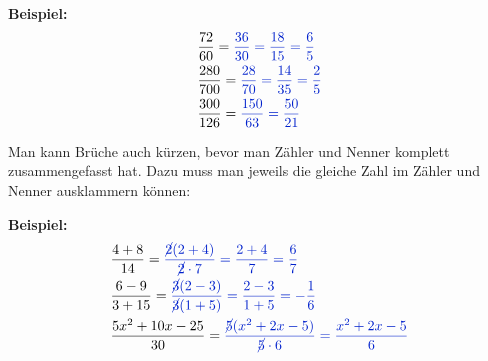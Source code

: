 \textbf{Beispiel:}
\begin{align*}
	&\frac{72}{60}=\textcolor{loes}{\frac{36}{30}=\frac{18}{15}=\frac{6}{5}}\\
	&\frac{280}{700}=\textcolor{loes}{\frac{28}{70}=\frac{14}{35}=\frac{2}{5}}\\
	&\frac{300}{126}=\textcolor{loes}{\frac{150}{63}=\frac{50}{21}}
\end{align*}

\medskip

Man kann Brüche auch kürzen, bevor man Zähler und Nenner komplett zusammengefasst hat. Dazu muss man jeweils die gleiche Zahl im Zähler und Nenner ausklammern können:

\textbf{Beispiel:}
\begin{align*}
	&\frac{4+8}{14}=\textcolor{loes}{\frac{\cancel{2}(2+4)}{\cancel{2}\cdot 7}=\frac{2+4}{7}=\frac{6}{7}}\\
	&\frac{6-9}{3+15}=\textcolor{loes}{\frac{\cancel{3}(2-3)}{\cancel{3}(1+5)}=\frac{2-3}{1+5}=-\frac{1}{6}}\\
	&\frac{5x^2+10x-25}{30}=\textcolor{loes}{\frac{\cancel{5}(x^2+2x-5)}{\cancel{5}\cdot 6}=\frac{x^2+2x-5}{6}}
\end{align*}

